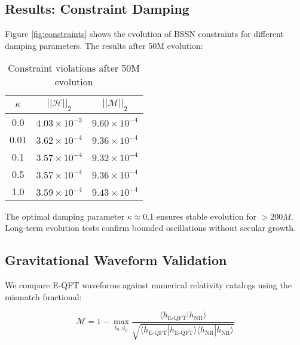 \documentclass[11pt,a4paper]{article}
\begin{document}
\subsection{Results: Constraint Damping}

Figure \ref{fig:constraints} shows the evolution of BSSN constraints for different damping parameters. The results after 50M evolution:

\begin{table}[h]
\centering
\caption{Constraint violations after 50M evolution}
\begin{tabular}{ccc}
\hline
$\kappa$ & $||\mathcal{H}||_2$ & $||\mathcal{M}||_2$ \\
\hline
0.0 & $4.03 \times 10^{-3}$ & $9.60 \times 10^{-4}$ \\
0.01 & $3.62 \times 10^{-4}$ & $9.36 \times 10^{-4}$ \\
0.1 & $3.57 \times 10^{-4}$ & $9.32 \times 10^{-4}$ \\
0.5 & $3.57 \times 10^{-4}$ & $9.36 \times 10^{-4}$ \\
1.0 & $3.59 \times 10^{-4}$ & $9.43 \times 10^{-4}$ \\
\hline
\end{tabular}
\end{table}

The optimal damping parameter $\kappa \approx 0.1$ ensures stable evolution for $> 200M$. Long-term evolution tests confirm bounded oscillations without secular growth.

\subsection{Gravitational Waveform Validation}

We compare E-QFT waveforms against numerical relativity catalogs \cite{SXS_catalog,GWTC3} using the mismatch functional:

\begin{equation}
\mathcal{M} = 1 - \max_{t_0,\phi_0} \frac{\langle h_{\text{E-QFT}} | h_{\text{NR}} \rangle}{\sqrt{\langle h_{\text{E-QFT}} | h_{\text{E-QFT}} \rangle \langle h_{\text{NR}} | h_{\text{NR}} \rangle}}
\end{equation}
\end{document}
